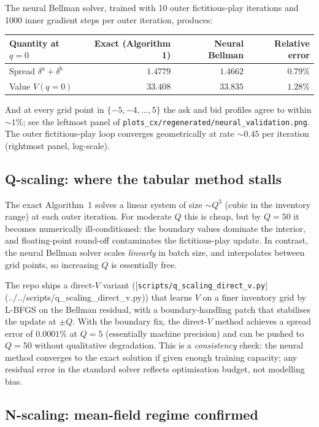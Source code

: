 The neural Bellman solver, trained with 10 outer fictitious-play iterations and 1000 inner gradient steps per outer iteration, produces:
\begin{table}[h]
\centering
\begin{tabular}{@{}lrrr@{}}
\toprule
Quantity at $q = 0$ & Exact (Algorithm 1) & Neural Bellman & Relative error \\ \midrule
Spread $\delta^a + \delta^b$ & $1.4779$ & $1.4662$ & $0.79\%$ \\
Value $V(q = 0)$ & $33.408$ & $33.835$ & $1.28\%$ \\ \bottomrule
\end{tabular}
\end{table}
And at every grid point in $\{-5, -4, \ldots, 5\}$ the ask and bid profiles agree to within $\sim 1\%$; see the leftmost panel of \texttt{plots\_cx/regenerated/neural\_validation.png}. The outer fictitious-play loop converges geometrically at rate $\sim 0.45$ per iteration (rightmost panel, log-scale).

\subsection{Q-scaling: where the tabular method stalls}
\label{subsec:qscaling}

The exact Algorithm~1 solves a linear system of size $\sim Q^3$ (cubic in the inventory range) at each outer iteration. For moderate $Q$ this is cheap, but by $Q = 50$ it becomes numerically ill-conditioned: the boundary values dominate the interior, and floating-point round-off contaminates the fictitious-play update. In contrast, the neural Bellman solver scales \emph{linearly} in batch size, and interpolates between grid points, so increasing $Q$ is essentially free.

The repo ships a direct-$V$ variant ([\texttt{scripts/q\_scaling\_direct\_v.py}](../../scripts/q_scaling_direct_v.py)) that learns $V$ on a finer inventory grid by L-BFGS on the Bellman residual, with a boundary-handling patch that stabilises the update at $\pm Q$. With the boundary fix, the direct-$V$ method achieves a spread error of $0.0001\%$ at $Q = 5$ (essentially machine precision) and can be pushed to $Q = 50$ without qualitative degradation. This is a \emph{consistency} check: the neural method converges to the exact solution if given enough training capacity; any residual error in the standard solver reflects optimisation budget, not modelling bias.

\subsection{N-scaling: mean-field regime confirmed}
\label{subsec:nscaling}

